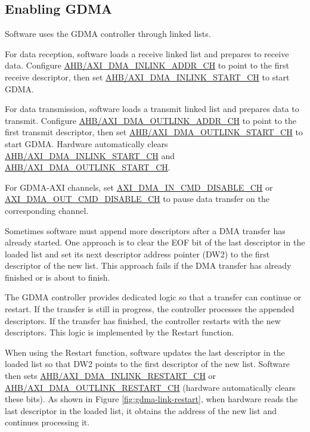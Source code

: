 \documentclass[main\_\_EN.tex]{subfiles}
\begin{document}
\subsection{Enabling GDMA}

Software uses the GDMA controller through linked lists.

For data reception, software loads a receive linked list and prepares to receive data. Configure \hyperref[fielddesc:AHBDMAINLINKADDRCHN]{AHB/AXI\_DMA\_INLINK\_ADDR\_CH} to point to the first receive descriptor, then set \hyperref[fielddesc:AHBDMAINLINKSTARTCHN]{AHB/AXI\_DMA\_INLINK\_START\_CH} to start GDMA.

For data transmission, software loads a transmit linked list and prepares data to transmit. Configure \hyperref[fielddesc:AHBDMAOUTLINKADDRCHN]{AHB/AXI\_DMA\_OUTLINK\_ADDR\_CH} to point to the first transmit descriptor, then set \hyperref[fielddesc:AHBDMAOUTLINKSTARTCHN]{AHB/AXI\_DMA\_OUTLINK\_START\_CH} to start GDMA. Hardware automatically clears \hyperref[fielddesc:AHBDMAINLINKSTARTCHN]{AHB/AXI\_DMA\_INLINK\_START\_CH} and \hyperref[fielddesc:AHBDMAOUTLINKSTARTCHN]{AHB/AXI\_DMA\_OUTLINK\_START\_CH}.

For GDMA-AXI channels, set \hyperref[fielddesc:AXIDMAINCMDDISABLECHN]{AXI\_DMA\_IN\_CMD\_DISABLE\_CH} or \hyperref[fielddesc:AXIDMAOUTCMDDISABLECHN]{AXI\_DMA\_OUT\_CMD\_DISABLE\_CH} to pause data transfer on the corresponding channel.

Sometimes software must append more descriptors after a DMA transfer has already started. One approach is to clear the EOF bit of the last descriptor in the loaded list and set its next descriptor address pointer (DW2) to the first descriptor of the new list. This approach fails if the DMA transfer has already finished or is about to finish.

The GDMA controller provides dedicated logic so that a transfer can continue or restart. If the transfer is still in progress, the controller processes the appended descriptors. If the transfer has finished, the controller restarts with the new descriptors. This logic is implemented by the Restart function.

When using the Restart function, software updates the last descriptor in the loaded list so that DW2 points to the first descriptor of the new list. Software then sets \hyperref[fielddesc:AHBDMAINLINKRESTARTCHN]{AHB/AXI\_DMA\_INLINK\_RESTART\_CH} or \hyperref[fielddesc:AHBDMAOUTLINKRESTARTCHN]{AHB/AXI\_DMA\_OUTLINK\_RESTART\_CH} (hardware automatically clears these bits). As shown in Figure \ref{fig:gdma-link-restart}, when hardware reads the last descriptor in the loaded list, it obtains the address of the new list and continues processing it.
\end{document}
